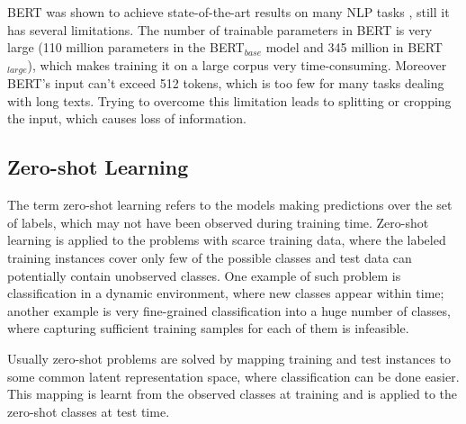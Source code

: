 BERT was shown to achieve state-of-the-art results on many NLP tasks \cite{devlin2018bert}, still it has several limitations. The number of trainable parameters in BERT is very large (110 million parameters in the BERT$_{base}$ model and 345 million in BERT$_{large}$), which makes training it on a large corpus very time-consuming. Moreover BERT's input can't exceed 512 tokens, which is too few for many tasks dealing with long texts. Trying to overcome this limitation leads to splitting or cropping the input, which causes loss of information.

\subsection{Zero-shot Learning}

The term zero-shot learning refers to the models making predictions over the set of labels, which may not have been observed during training time. Zero-shot learning is applied to the problems with scarce training data, where the labeled training instances cover only few of the possible classes and test data can potentially contain unobserved classes. One example of such problem is classification in a dynamic environment, where new classes appear within time; another example is very fine-grained classification into a huge number of classes, where capturing sufficient training samples for each of them is infeasible.

Usually zero-shot problems are solved by mapping training and test instances to some common latent representation space, where classification can be done easier. This mapping is learnt from the observed classes at training and is applied to the zero-shot classes at test time. %



